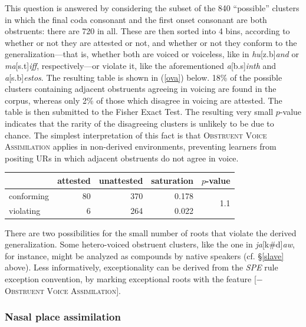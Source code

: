This question is answered by considering the subset of the 840 ``possible'' clusters in which the final coda consonant and the first onset consonant are both obstruents: there are 720 in all. These are then sorted into 4 bins, according to whether or not they are attested or not, and whether or not they conform to the generalization---that is, whether both are voiced or voiceless, like in \emph{hu}[z.b]\emph{and} or \emph{ma}[s.t]\emph{iff}, respectively---or violate it, like the aforementioned \emph{a}[b.s]\emph{inth} and \emph{a}[s.b]\emph{estos}. The resulting table is shown in (\ref{ova}) below. 18\% of the possible clusters containing adjacent obstruents agreeing in voicing are found in the corpus, whereas only 2\% of those which disagree in voicing are attested. The table is then submitted to the Fisher Exact Test. The resulting very small $p$-value indicates that the rarity of the disagreeing clusters is unlikely to be due to chance. The simplest interpretation of this fact is that \textsc{Obstruent Voice Assimilation} applies in non-derived environments, preventing learners from positing URs in which adjacent obstruents do not agree in voice.

\begin{example} \label{ova}
\begin{tabular}{l r r r r}
\toprule
           & attested & unattested & saturation & $p$-value                   \\
\midrule
conforming & 80       & 370        & 0.178      & \multirow{2}{*}{1.1\e{-11}} \\
violating  &  6       & 264        & 0.022                                    \\
\bottomrule
\end{tabular}
\end{example}

There are two possibilities for the small number of roots that violate the derived generalization. Some hetero-voiced obstruent clusters, like the one in \emph{ja}[k\#d]\emph{aw}, for instance, might be analyzed as compounds by native speakers (cf. \S\ref{slave} above). Less informatively, exceptionality can be derived from the \emph{SPE} rule exception convention, by marking exceptional roots with the feature [$-$\textsc{Obstruent Voice Assimilation}].

\subsubsection{Nasal place assimilation} \label{npasection}

